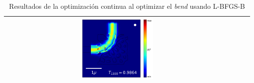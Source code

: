 \begin{table}[ht]
\begin{tabular}{|c|c|c|c|}
      \includegraphics[width=0.33\textwidth]{image/results/bend/L-BFGS-B/visualize_field_fab_512.png} \\
    \hline
    \end{tabular}
    \hspace*{-3cm}
    \caption{Resultados de la optimización continua al optimizar el \emph{bend} usando L-BFGS-B}
    \label{tab:opt-cont-L-BFGS-B-bend}
\end{table}

